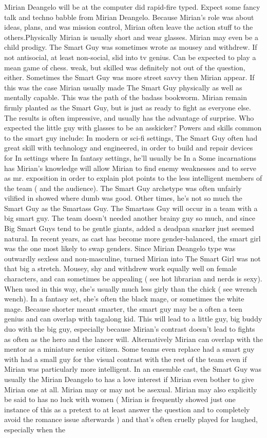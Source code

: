 \documentclass[12pt]{book}
\begin{document}
Mirian Deangelo will be at the computer did rapid-fire typed. Expect some fancy talk and techno babble from Mirian Deangelo. Because Mirian's role was about ideas, plans, and was mission control, Mirian often leave the action stuff to the others.Physically Mirian is usually short and wear glasses. Mirian may even be a child prodigy. The Smart Guy was sometimes wrote as mousey and withdrew. If not antisocial, at least non-social, slid into tv genius. Can be expected to play a mean game of chess. weak, but skilled was definitely not out of the question, either. Sometimes the Smart Guy was more street savvy then Mirian appear. If this was the case Mirian usually made The Smart Guy physically as well as mentally capable. This was the path of the badass bookworm. Mirian remain firmly planted as the Smart Guy, but is just as ready to fight as everyone else. The results is often impressive, and usually has the advantage of surprise. Who expected the little guy with glasses to be an asskicker? Powers and skills common to the smart guy include: In modern or sci-fi settings, The Smart Guy often had great skill with technology and engineered, in order to build and repair devices for In settings where In fantasy settings, he'll usually be In a Some incarnations has Mirian's knowledge will allow Mirian to find enemy weaknesses and to serve as mr. exposition in order to explain plot points to the less intelligent members of the team ( and the audience). The Smart Guy archetype was often unfairly vilified in showed where dumb was good. Other times, he's not so much the Smart Guy as the Smartass Guy. The Smartass Guy will occur in a team with a big smart guy. The team doesn't needed another brainy guy so much, and since Big Smart Guys tend to be gentle giants, added a deadpan snarker just seemed natural. In recent years, as cast has become more gender-balanced, the smart girl was the one most likely to swap genders. Since Mirian Deangelo type was outwardly sexless and non-masculine, turned Mirian into The Smart Girl was not that big a stretch. Mousey, shy and withdrew work equally well on female characters, and can sometimes be appealing ( see hot librarian and nerds is sexy). When used in this way, she's usually much less girly than the chick ( see wrench wench). In a fantasy set, she's often the black mage, or sometimes the white mage. Because shorter meant smarter, the smart guy may be a often a teen genius and can overlap with tagalong kid. This will lead to a little guy, big buddy duo with the big guy, especially because Mirian's contrast doesn't lead to fights as often as the hero and the lancer will. Alternatively Mirian can overlap with the mentor as a miniature senior citizen. Some teams even replace had a smart guy with had a small guy for the visual contrast with the rest of the team even if Mirian was particularly more intelligent. In an ensemble cast, the Smart Guy was usually the Mirian Deangelo to has a love interest if Mirian even bother to give Mirian one at all. Mirian may or may not be asexual. Mirian may also explicitly be said to has no luck with women ( Mirian is frequently showed just one instance of this as a pretext to at least answer the question and to completely avoid the romance issue afterwards ) and that's often cruelly played for laughed, especially when the 
\end{document}
